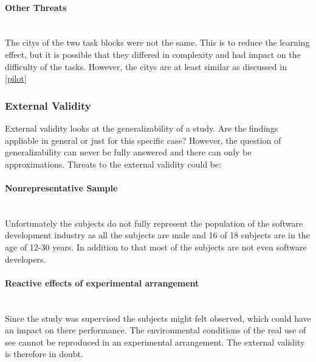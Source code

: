 \paragraph{Other Threats}\mbox{}\\
The \glspl{city} of the two task blocks were not the same. 
This is to reduce the learning effect, but it is possible that they differed in complexity and had impact on the difficulty of the tasks.
However, the \glspl{city} are at least similar as discussed in \ref{pilot}
\subsubsection{External Validity}
External validity looks at the generalizability of a study.
Are the findings appliable in general or just for this specific case?
However, the question of generalizability can never be fully answered and there can only be approximations. 
Threats to the external validity could be:

\paragraph{Nonrepresentative Sample}\mbox{}\\
Unfortunately the subjects do not fully represent the population of the software development industry as all the subjects are male and 16 of 18 subjects are in the age of 12-30 years.
In addition to that most of the subjects are not even software developers.

\paragraph{Reactive effects of experimental arrangement}\mbox{}\\
Since the study was supervised the subjects might felt observed, which could have an impact on there performance.
The environmental conditions of the real use of \gls{see} cannot be reproduced in an experimental arrangement.
The external validity is therefore in doubt.
